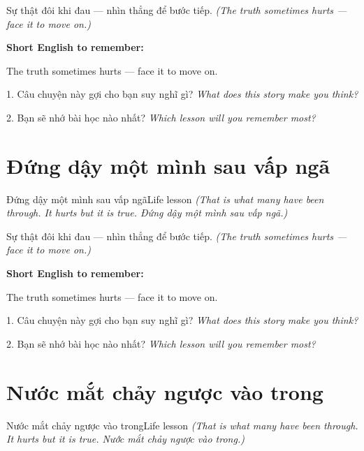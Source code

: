 \begin{baihoc}
Sự thật đôi khi đau — nhìn thẳng để bước tiếp.
\textit{(The truth sometimes hurts — face it to move on.)}
\end{baihoc}

\begin{ghinhoanh}
\textbf{Short English to remember:}

The truth sometimes hurts — face it to move on.

\end{ghinhoanh}

\begin{tuhocnhanh}
1. Câu chuyện này gợi cho bạn suy nghĩ gì? \textit{What does this story make you think?}

2. Bạn sẽ nhớ bài học nào nhất? \textit{Which lesson will you remember most?}
\end{tuhocnhanh}
\ngancach


\section{Đứng dậy một mình sau vấp ngã}
\begin{truyen}{Đứng dậy một mình sau vấp ngã}{Life lesson}
\textit{(That is what many have been through. It hurts but it is true. Đứng dậy một mình sau vấp ngã.)}
\end{truyen}

\begin{baihoc}
Sự thật đôi khi đau — nhìn thẳng để bước tiếp.
\textit{(The truth sometimes hurts — face it to move on.)}
\end{baihoc}

\begin{ghinhoanh}
\textbf{Short English to remember:}

The truth sometimes hurts — face it to move on.

\end{ghinhoanh}

\begin{tuhocnhanh}
1. Câu chuyện này gợi cho bạn suy nghĩ gì? \textit{What does this story make you think?}

2. Bạn sẽ nhớ bài học nào nhất? \textit{Which lesson will you remember most?}
\end{tuhocnhanh}
\ngancach


\section{Nước mắt chảy ngược vào trong}
\begin{truyen}{Nước mắt chảy ngược vào trong}{Life lesson}
\textit{(That is what many have been through. It hurts but it is true. Nước mắt chảy ngược vào trong.)}
\end{truyen}

